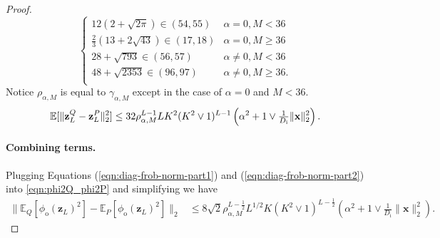 \documentclass[twoside]{article}
\renewcommand{\ss}[1]{_{\text{#1}}}
\newcommand{\vx}{\mathbf{x}}
\newcommand{\vz}{\mathbf{z}}
\newcommand{\E}{\mathbb{E}}
\renewcommand{\P}{\mathbb{P}}
\newcommand{\Q}{\mathbb{Q}}
\renewcommand{\Q}{\ensuremath{Q}}
\renewcommand{\P}{\ensuremath{P}}
\renewcommand{\ss}[1]{_{\text{#1}}}        %
\DeclarePairedDelimiter\norm{\|}{\|}             %
\theoremstyle{theoremstyle}
\begin{document}
\begin{proof}
\begin{equation}
    \begin{cases}
    12(2+\sqrt{2\pi}) \in (54,55) & \alpha=0, M<36 \\
    \tfrac23(13+2\sqrt{43}) \in (17,18) & \alpha=0, M\ge 36 \\
    28 + \sqrt{793} \in (56,57) & \alpha\neq 0, M<36 \\
    48 + \sqrt{2353} \in (96,97) & \alpha\neq 0, M\ge 36. \\
    \end{cases}
\end{equation}
Notice $\rho_{\alpha, M}$ is equal to $\gamma_{\alpha, M}$ except in the case of $\alpha=0$ and $M<36$.
\begin{equation}
    \E[\norm{\vz^Q_{L} - \vz^P_{L}}_2^2] 
    \le 32 \rho_{\alpha, M}^{L - 1} L K^2 (K^2 \lor 1)^{L - 1} \left(\alpha^2 + 1\lor \tfrac1{D\ss{i}}\|\vx\|^2_2\right). \label{eqn:diag-frob-norm-part2}
\end{equation}

\paragraph{Combining terms.}
Plugging Equations (\ref{eqn:diag-frob-norm-part1}) and (\ref{eqn:diag-frob-norm-part2}) into \cref{eqn:phi2Q_phi2P} and simplifying we have
\begin{align}
    \|\E_{\Q}[\phi\ss{o}(\vz_{L})^2 ]- \E_{\P}[\phi\ss{o}(\vz_{L})^2]\|_2
    &\le 8 \sqrt{2} \rho_{\alpha, M}^{L-\tfrac12} L^{1/2} K (K^2 \lor 1)^{L-\tfrac12}\left(\alpha^2 + 1\lor \tfrac1{D\ss{i}}\|\vx\|^2_2\right).
\end{align}


\end{proof}
\end{document}
